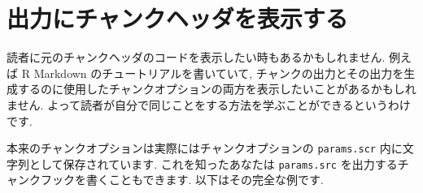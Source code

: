 \documentclass[
  11pt,
]{bxjsreport}
\begin{document}
\hypertarget{show-header}{%
\section{出力にチャンクヘッダを表示する}\label{show-header}}

読者に元のチャンクヘッダのコードを表示したい時もあるかもしれません. 例えば R Markdown のチュートリアルを書いていて, チャンクの出力とその出力を生成するのに使用したチャンクオプションの両方を表示したいことがあるかもしれません. よって読者が自分で同じことをする方法を学ぶことができるというわけです.

本来のチャンクオプションは実際にはチャンクオプションの \texttt{params.scr} 内に文字列として保存されています. これを知ったあなたは \texttt{params.src} を出力するチャンクフックを書くこともできます. 以下はその完全な例です.
\end{document}
